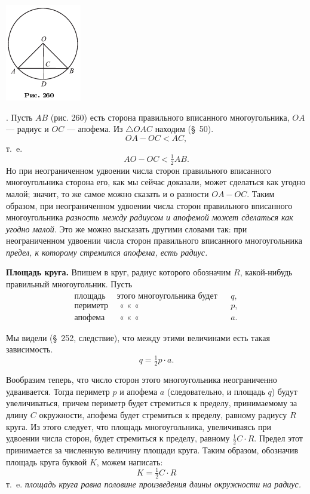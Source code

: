 \documentclass[oneside]{book}
\begin{document}
\includegraphics{pics/ris-260}

.
Пусть $AB$ (рис. 260) есть сторона правильного вписанного многоугольника, $OA$ — радиус и $OC$ — апофема.
Из $\triangle OAC$ находим (§~50).
\[OA-OC<AC,\]
т.~e.
\[AO-OC<\tfrac12 AB.\]
Но при неограниченном удвоении числа сторон правильного вписанного многоугольника сторона его, как мы сейчас доказали, может сделаться как угодно малой;
значит, то же самое можно сказать и о разности $OA-OC$.
Таким образом, при неограниченном удвоении числа сторон правильного вписанного многоугольника \emph{разность между радиусом и апофемой может сделаться как угодно малой}.
Это же можно высказать другими словами так:
при неограниченном удвоении числа сторон правильного вписанного многоугольника \emph{предел, к которому стремится апофема, есть радиус.}

\textbf{Площадь круга.}
Впишем в круг, радиус которого обозначим $R$, какой-нибудь правильный многоугольник.
Пусть
\begin{align*}
\text{площадь}~&\text{этого многоугольника будет}&&q,
\\
\text{периметр}~&\text{\ \ «\ \ \ \ \ \ \ \ \ \ \ \ «\ \ \ \ \ \ \ \ \ \ \ \ \ \ \ «\ }&&p,
\\
\text{апофема}~&\text{\ \ «\ \ \ \ \ \ \ \ \ \ \ \ «\ \ \ \ \ \ \ \ \ \ \ \ \ \ \ «\ }&&a.
\end{align*}%

Мы видели (§~252, следствие), что между этими величинами есть такая зависимость.
\[q=\tfrac12p\cdot a.\]

Вообразим теперь, что число сторон этого многоугольника неограниченно удваивается.
Тогда периметр $p$ и апофема  $a$ (следовательно, и площадь $q$) будут увеличиваться, причем периметр будет стремиться к пределу, принимаемому за длину $C$ окружности, апофема будет стремиться к пределу, равному радиусу $R$ круга.
Из этого следует, что площадь многоугольника, увеличиваясь при удвоении числа сторон, будет стремиться к пределу, равному $\tfrac12 C\cdot R$.
Предел этот принимается за численную величину площади круга.
Таким образом, обозначив площадь круга буквой $K$, можем написать:
\[K=\tfrac12 C\cdot R\]
т.~e. \emph{площадь круга равна половине произведения длины окружности на радиус.}
\end{document}
